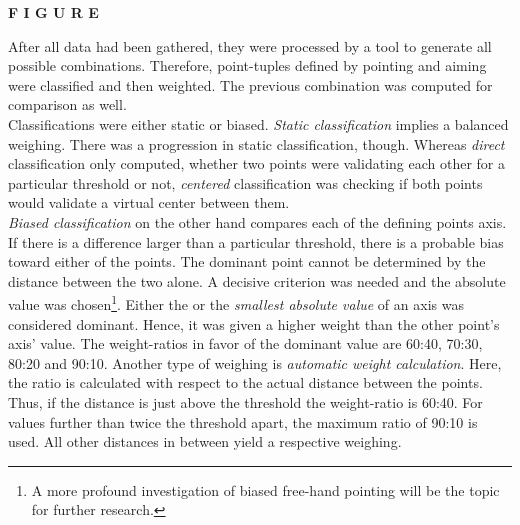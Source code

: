 \textbf{F I G U R E}

After all data had been gathered, they were processed by a tool to generate all possible combinations. Therefore, point-tuples defined by pointing and aiming were classified and then weighted. The previous combination was computed for comparison as well.
\\
Classifications were either static or biased. \textit{Static classification} implies a balanced weighing. There was a progression in static classification, though. Whereas \textit{direct} classification only computed, whether two points were validating each other for a particular threshold or not, \textit{centered} classification was checking if both points would validate a virtual center between them.
\\
\textit{Biased classification} on the other hand compares each of the defining points axis. If there is a difference larger than a particular threshold, there is a probable bias toward either of the points. The dominant point cannot be determined by the distance between the two alone. A decisive criterion was needed and the absolute value was chosen\footnote{A more profound investigation of biased free-hand pointing will be the topic for further research.}. Either the  or the \textit{smallest absolute value} of an axis was considered dominant. Hence, it was given a higher weight than the other point's axis' value. The weight-ratios in favor of the dominant value are 60:40, 70:30, 80:20 and 90:10. Another type of weighing is \textit{automatic weight calculation}. Here, the ratio is calculated with respect to the actual distance between the points. Thus, if the distance is just above the threshold the weight-ratio is 60:40. For values further than twice the threshold apart, the maximum ratio of 90:10 is used. All other distances in between yield a respective weighing.

